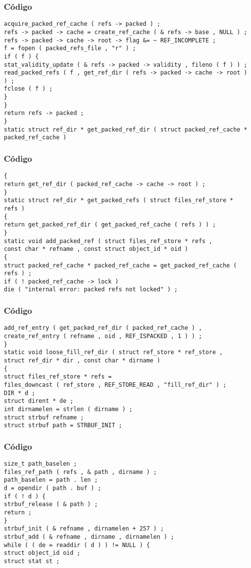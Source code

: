 \documentclass{beamer}
\begin{document}
\begin{frame}[fragile]
\frametitle{C\'odigo}
\begin{verbatim}
acquire_packed_ref_cache ( refs -> packed ) ; 
refs -> packed -> cache = create_ref_cache ( & refs -> base , NULL ) ; 
refs -> packed -> cache -> root -> flag &= ~ REF_INCOMPLETE ; 
f = fopen ( packed_refs_file , "r" ) ; 
if ( f ) { 
stat_validity_update ( & refs -> packed -> validity , fileno ( f ) ) ; 
read_packed_refs ( f , get_ref_dir ( refs -> packed -> cache -> root ) ) ; 
fclose ( f ) ; 
} 
} 
return refs -> packed ; 
} 
static struct ref_dir * get_packed_ref_dir ( struct packed_ref_cache * packed_ref_cache ) 
\end{verbatim}
\end{frame}
\begin{frame}[fragile]
\frametitle{C\'odigo}
\begin{verbatim}
{ 
return get_ref_dir ( packed_ref_cache -> cache -> root ) ; 
} 
static struct ref_dir * get_packed_refs ( struct files_ref_store * refs ) 
{ 
return get_packed_ref_dir ( get_packed_ref_cache ( refs ) ) ; 
} 
static void add_packed_ref ( struct files_ref_store * refs , 
const char * refname , const struct object_id * oid ) 
{ 
struct packed_ref_cache * packed_ref_cache = get_packed_ref_cache ( refs ) ; 
if ( ! packed_ref_cache -> lock ) 
die ( "internal error: packed refs not locked" ) ; 
\end{verbatim}
\end{frame}
\begin{frame}[fragile]
\frametitle{C\'odigo}
\begin{verbatim}
add_ref_entry ( get_packed_ref_dir ( packed_ref_cache ) , 
create_ref_entry ( refname , oid , REF_ISPACKED , 1 ) ) ; 
} 
static void loose_fill_ref_dir ( struct ref_store * ref_store , 
struct ref_dir * dir , const char * dirname ) 
{ 
struct files_ref_store * refs = 
files_downcast ( ref_store , REF_STORE_READ , "fill_ref_dir" ) ; 
DIR * d ; 
struct dirent * de ; 
int dirnamelen = strlen ( dirname ) ; 
struct strbuf refname ; 
struct strbuf path = STRBUF_INIT ; 
\end{verbatim}
\end{frame}
\begin{frame}[fragile]
\frametitle{C\'odigo}
\begin{verbatim}
size_t path_baselen ; 
files_ref_path ( refs , & path , dirname ) ; 
path_baselen = path . len ; 
d = opendir ( path . buf ) ; 
if ( ! d ) { 
strbuf_release ( & path ) ; 
return ; 
} 
strbuf_init ( & refname , dirnamelen + 257 ) ; 
strbuf_add ( & refname , dirname , dirnamelen ) ; 
while ( ( de = readdir ( d ) ) != NULL ) { 
struct object_id oid ; 
struct stat st ; 
\end{verbatim}
\end{frame}
\end{document}
